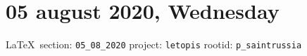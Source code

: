  
 
\section{05 august 2020, Wednesday}
  
{\ifDEBUG\fi\small\LaTeX~section: \verb|05_08_2020| project: \verb|letopis| rootid: \verb|p_saintrussia|}


  
